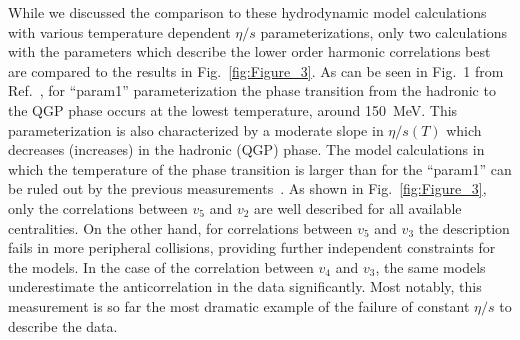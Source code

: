 While we discussed the comparison to these hydrodynamic model calculations with various temperature dependent $\eta/s$ parameterizations, only two calculations with the parameters which describe the lower order harmonic correlations best are compared to the results in Fig.~\ref{fig:Figure_3}. 
As can be seen in Fig.~1 from Ref.~\cite{Niemi:2015qia}, for ``param1'' parameterization the phase transition from the hadronic to the QGP phase occurs at the lowest temperature, around 150~MeV. This parameterization is also characterized by a moderate slope in $\eta/s(T)$ which decreases (increases) in the hadronic (QGP) phase.
The model calculations in which the temperature of the phase transition is larger than for the ``param1'' can be ruled out by the previous measurements~\cite{ALICE:2016kpq}.
As shown in Fig.~\ref{fig:Figure_3}, only the correlations between $v_5$ and $v_2$ are well described for all available centralities. 
On the other hand, for correlations between $v_5$ and $v_3$ the description fails in more peripheral collisions, providing further independent constraints for the models.
In the case of the correlation between $v_4$ and $v_3$, the same models underestimate the anticorrelation in the data significantly.
Most notably, this measurement is so far the most dramatic example of the failure of constant $\eta/s$ to describe the data.

%


